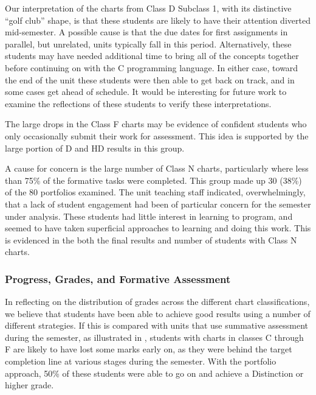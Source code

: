 Our interpretation of the charts from Class D Subclass 1, with its distinctive ``golf club'' shape, is that these students are likely to have their attention diverted mid-semester. A possible cause is that the due dates for first assignments in parallel, but unrelated, units typically fall in this period. Alternatively, these students may have needed additional time to bring all of the concepts together before continuing on with the C programming language. In either case, toward the end of the unit these students were then able to get back on track, and in some cases get ahead of schedule. It would be interesting for future work to examine the reflections of these students to verify these interpretations.

The large drops in the Class F charts may be evidence of confident students who only occasionally submit their work for assessment. This idea is supported by the large portion of D and HD results in this group.

A cause for concern is the large number of Class N charts, particularly where less than 75\% of the formative tasks were completed. This group made up 30 (38\%) of the 80 portfolios examined. The unit teaching staff indicated, overwhelmingly, that a lack of student engagement had been of particular concern for the semester under analysis. These students had little interest in learning to program, and seemed to have taken superficial approaches to learning and doing this work. This is evidenced in the both the final results and number of students with Class N charts.



\subsubsection{Progress, Grades, and Formative Assessment} %
\label{sub:progress_grades_and_formative_assessment}

In reflecting on the distribution of grades across the different chart classifications, we believe that students have been able to achieve good results using a number of different strategies. If this is compared with units that use summative assessment during the semester, as illustrated in , students with charts in classes C through F are likely to have lost some marks early on, as they were behind the target completion line at various stages during the semester. With the portfolio approach, 50\% of these students were able to go on and achieve a Distinction or higher grade.

